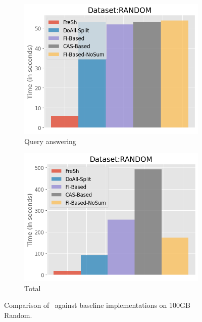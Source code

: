 \begin{figure}[htbp]
\begin{subfigure}{0.48\textwidth}
        \includegraphics[width=\textwidth]{figures/Experiments/baselines-random-query.png}
        \caption{Query answering}
        \label{fig:eval:baselines:random:100GB:query-answering}
    \end{subfigure}  
    \begin{subfigure}{0.48\textwidth}  
        \includegraphics[width=\textwidth]{figures/Experiments/baselines-random-total.png}
        \caption{Total}
        \label{fig:eval:baselines:random:100GB:total}
    \end{subfigure}   

    \caption{Comparison of \Fresh\ against baseline implementations on 100GB Random.}
    \label{fig:eval:baselines:random:100GB}
\end{figure}


